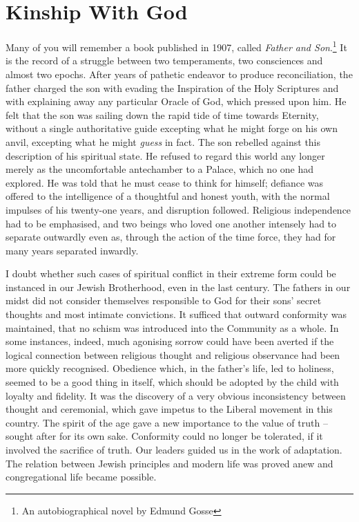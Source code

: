 \chapter{Kinship With God}

Many of you will remember a book published in 1907,
called \textsl{Father and Son}.\footnote{An autobiographical novel by Edmund Gosse} It is the record of a struggle between two temperaments,
two consciences and almost two
epochs. After years of pathetic endeavor to produce reconciliation,
the father charged the son with evading the
Inspiration of the Holy Scriptures and with explaining away
any particular Oracle of God, which pressed upon him. He
felt that the son was sailing down the rapid tide of time
towards Eternity, without a single authoritative guide
excepting what he might forge on his own anvil, excepting
what he might \textsl{guess} in fact. The son rebelled against this
description of his spiritual state. He refused to regard
this world any longer merely as the uncomfortable
antechamber to a Palace, which no one had explored. He was
told that he must cease to think for himself; defiance was
offered to the intelligence of a thoughtful and honest
youth, with the normal impulses of his twenty-one years,
and disruption followed. Religious independence had to be
emphasised, and two beings who loved one another intensely
had to separate outwardly even as, through the action of
the time force, they had for many years separated inwardly.

I doubt whether such cases of spiritual conflict in
their extreme form could be instanced in our Jewish
Brotherhood, even in the last century. The fathers in our
midst did not consider themselves responsible to God for
their sons' secret thoughts and most intimate convictions.
It sufficed that outward conformity was maintained, that no
schism was introduced into the Community as a whole. In
some instances, indeed, much agonising sorrow could have
been averted if the logical connection between religious
thought and religious observance had been more quickly
recognised. Obedience which, in the father's life, led to
holiness, seemed to be a good thing in itself, which should
be adopted by the child with loyalty and fidelity. It was
the discovery of a very obvious inconsistency between
thought and ceremonial, which gave impetus to the Liberal
movement in this country. The spirit of the age gave a new
importance to the value of truth -- sought after for its own
sake. Conformity could no longer be tolerated, if it
involved the sacrifice of truth. Our leaders guided us in
the work of adaptation. The relation between Jewish principles
and modern life was proved anew and congregational
life became possible.


